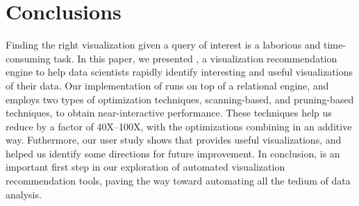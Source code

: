 
\section{Conclusions}
\label{sec:conc}

Finding the right visualization given a query of interest is a
laborious and time-consuming task.
In this paper, we presented \SeeDB, a visualization recommendation
engine to help data scientists 
rapidly identify interesting and useful visualizations of their data.
Our implementation of \SeeDB runs on top of a relational engine, and employs two types of optimization 
techniques, scanning-based, and pruning-based techniques, to obtain near-interactive performance.
These techniques help us reduce by a factor of 40X--100X, with the optimizations combining in an additive way. 
Futhermore, our user study shows that \SeeDB provides useful
visualizations, and helped us identify some directions for future improvement.
In conclusion, \SeeDB is an important first step in our exploration of 
automated visualization recommendation tools, 
paving the way toward automating all the tedium of data analysis.



